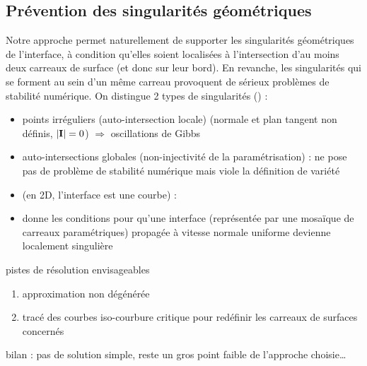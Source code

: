 \subsection{Prévention des singularités géométriques}
Notre approche permet naturellement de supporter les singularités géométriques de l'interface, à condition qu'elles soient localisées à l'intersection d'au moins deux carreaux de surface (et donc sur leur bord).
En revanche, les singularités qui se forment au sein d'un même carreau provoquent de sérieux problèmes de stabilité numérique.
On distingue 2 types de singularités (\cite[p.320]{patrikalakis2009}) :
\begin{itemize}
	\item points irréguliers (auto-intersection locale) (normale et plan tangent non définis, $\left\lvert {\mathbf{I}} \right\rvert = 0$) $\Rightarrow$ oscillations de Gibbs
	\item auto-intersections globales (non-injectivité de la paramétrisation) : ne pose pas de problème de stabilité numérique mais viole la définition de variété
\end{itemize}

\begin{itemize}
	\item \cite{jiao2001} (en 2D, \ie l'interface est une courbe) : 
	\item \cite{farouki1986} donne les conditions pour qu'une interface (représentée par une mosaïque de carreaux paramétriques) propagée à vitesse normale uniforme devienne localement singulière
\end{itemize}

pistes de résolution envisageables
\begin{enumerate}
	\item approximation non dégénérée \cite{farouki1986}
	\item tracé des courbes iso-courbure critique \cite[chap.8]{patrikalakis2009} pour redéfinir les carreaux de surfaces concernés
\end{enumerate}

bilan : pas de solution simple, reste un gros point faible de l'approche choisie\ldots
